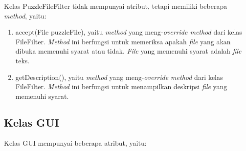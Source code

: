 Kelas PuzzleFileFilter tidak mempunyai atribut, tetapi memiliki beberapa \textit{method}, yaitu:

\begin{enumerate}
\item accept(File puzzleFile), yaitu \textit{method} yang meng-\textit{override method} dari kelas FileFilter. \textit{Method} ini berfungsi untuk memeriksa apakah \textit{file} yang akan dibuka memenuhi syarat atau tidak. \textit{File} yang memenuhi syarat adalah \textit{file} teks.
\item getDescription(), yaitu \textit{method} yang meng-\textit{override method} dari kelas FileFilter. \textit{Method} ini berfungsi untuk menampilkan deskripsi \textit{file} yang memenuhi syarat.
\end{enumerate}

\subsection{Kelas GUI}
\label{sec:kelasgui}

Kelas GUI mempunyai beberapa atribut, yaitu:

